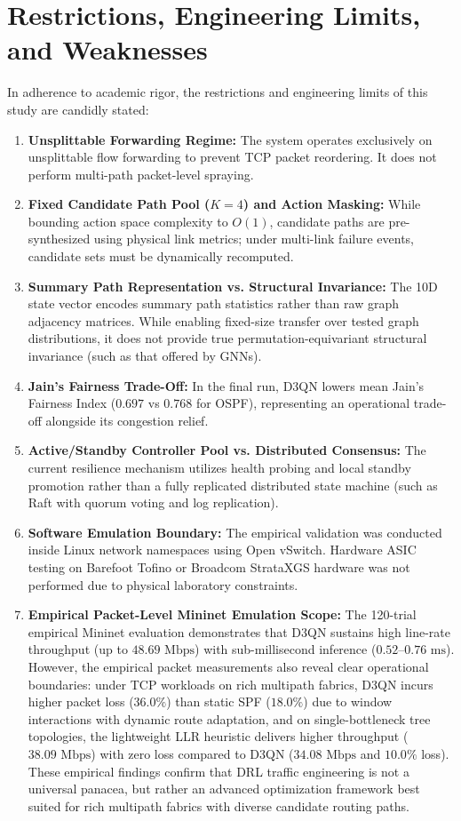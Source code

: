 \documentclass[12pt,a4paper,oneside]{report}
\begin{document}
\section{Restrictions, Engineering Limits, and Weaknesses}
In adherence to academic rigor, the restrictions and engineering limits of this study are candidly stated:
\begin{enumerate}
    \item \textbf{Unsplittable Forwarding Regime:} The system operates exclusively on unsplittable flow forwarding to prevent TCP packet reordering. It does not perform multi-path packet-level spraying.
    \item \textbf{Fixed Candidate Path Pool ($K=4$) and Action Masking:} While bounding action space complexity to $O(1)$, candidate paths are pre-synthesized using physical link metrics; under multi-link failure events, candidate sets must be dynamically recomputed.
    \item \textbf{Summary Path Representation vs. Structural Invariance:} The 10D state vector encodes summary path statistics rather than raw graph adjacency matrices. While enabling fixed-size transfer over tested graph distributions, it does not provide true permutation-equivariant structural invariance (such as that offered by GNNs).
    \item \textbf{Jain's Fairness Trade-Off:} In the final run, D3QN lowers mean Jain's Fairness Index ($0.697$ vs $0.768$ for OSPF), representing an operational trade-off alongside its congestion relief.
    \item \textbf{Active/Standby Controller Pool vs. Distributed Consensus:} The current resilience mechanism utilizes health probing and local standby promotion rather than a fully replicated distributed state machine (such as Raft with quorum voting and log replication).
    \item \textbf{Software Emulation Boundary:} The empirical validation was conducted inside Linux network namespaces using Open vSwitch. Hardware ASIC testing on Barefoot Tofino or Broadcom StrataXGS hardware was not performed due to physical laboratory constraints.
    \item \textbf{Empirical Packet-Level Mininet Emulation Scope:} The 120-trial empirical Mininet evaluation demonstrates that D3QN sustains high line-rate throughput (up to $48.69\text{ Mbps}$) with sub-millisecond inference ($0.52$--$0.76\text{ ms}$). However, the empirical packet measurements also reveal clear operational boundaries: under TCP workloads on rich multipath fabrics, D3QN incurs higher packet loss ($36.0\%$) than static SPF ($18.0\%$) due to window interactions with dynamic route adaptation, and on single-bottleneck tree topologies, the lightweight LLR heuristic delivers higher throughput ($38.09\text{ Mbps}$) with zero loss compared to D3QN ($34.08\text{ Mbps}$ and $10.0\%$ loss). These empirical findings confirm that DRL traffic engineering is not a universal panacea, but rather an advanced optimization framework best suited for rich multipath fabrics with diverse candidate routing paths.
\end{enumerate}
\end{document}
